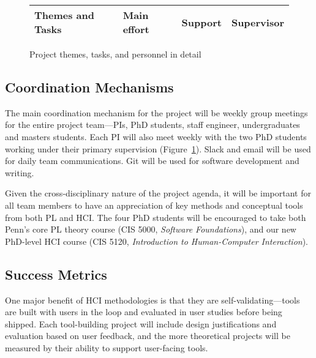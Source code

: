 \renewcommand{\tasksection}{\tasksectionroles}
\begin{figure}[t]
\centering
\begin{tabular}[c]{@{}llll}
  {\bf Themes and Tasks} & {\bf Main effort} & {\bf Support}
  & {\bf Supervisor}
\\
  \hline
  
\end{tabular}
\vspace*{-2ex}
\caption{Project themes, tasks, and personnel in detail
  \iflater{}
    \fi}
\label{fig:roles}
\end{figure}

\subsection*{Coordination Mechanisms}

The main coordination mechanism for the project will be weekly group
meetings for the entire project team---PIs, PhD students, staff
engineer, undergraduates and masters students.
%
Each PI will also meet weekly with the two PhD students working under
their primary supervision (Figure~\ref{fig:roles}).
%
Slack and email will be used for daily team communications.  Git will
be used for software development and writing.

Given the cross-disciplinary nature of the project agenda, it will be
important for all team members to have an appreciation of key methods
and conceptual tools from both PL and HCI.  The four PhD students will
be encouraged to take both Penn's core PL theory course (CIS 5000,
{\em Software Foundations}), and our new PhD-level HCI course (CIS
5120, {\em Introduction to Human-Computer Interaction}).


\subsection*{Success Metrics}

One major benefit of
HCI methodologies is that they are self-validating---tools are built with users
in the loop and evaluated in user studies before being shipped.
Each tool-building project will include design justifications and
evaluation based on user feedback, and the more theoretical
projects will be measured by their ability to support user-facing tools.

